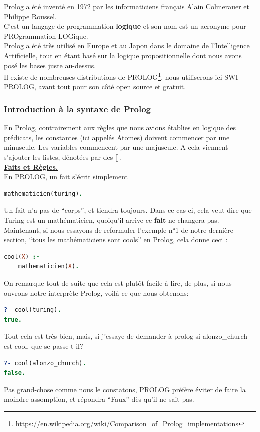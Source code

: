 \documentclass[a4paper, 12pt]{article}
\numberwithin{equation}{subsection}
\begin{document}
Prolog a été inventé en 1972 par les informaticiens français Alain Colmerauer et Philippe Roussel. \\

C'est un langage de programmation {\bf logique} et son nom est un acronyme pour PROgrammation LOGique. \\

Prolog a été très utilisé en Europe et au Japon dans le domaine de l'Intelligence Artificielle, tout en étant basé sur la logique propositionnelle dont nous avons posé les bases juste au-dessus. \\

Il existe de nombreuses distributions de PROLOG\footnote{https://en.wikipedia.org/wiki/Comparison\_of\_Prolog\_implementations}, nous utiliserons ici SWI-PROLOG, avant tout pour son côté open source et gratuit.
\subsubsection{Introduction à la syntaxe de Prolog}
En Prolog, contrairement aux règles que nous avions établies en logique des prédicats, les constantes (ici appelés Atomes) doivent commencer par une minuscule. Les variables commencent par une majuscule. A cela viennent s'ajouter les listes, dénotées par des []. \\

\underline{{\bf Faits et Règles.}} \\[0.2cm]
En PROLOG, un fait s'écrit simplement \\
\begin{lstlisting}[language=Prolog]
mathematicien(turing).
\end{lstlisting}
Un fait n'a pas de ``corps'', et tiendra toujours. Dans ce cas-ci, cela veut dire que Turing est un mathématicien, quoiqu'il arrive ce {\bf fait} ne changera pas. \\

Maintenant, si nous essayons de reformuler l'exemple n°1 de notre dernière section, ``tous les mathématiciens sont cools'' en Prolog, cela donne ceci :
\begin{lstlisting}[language=Prolog]
cool(X) :-
    mathematicien(X).
\end{lstlisting}
On remarque tout de suite que cela est plutôt facile à lire, de plus, si nous ouvrons notre interprète Prolog, voilà ce que nous obtenons:
\begin{lstlisting}[language=Prolog]
?- cool(turing).
true.
\end{lstlisting}
Tout cela est très bien, mais, si j'essaye de demander à prolog si alonzo\_church est cool, que se passe-t-il?
\begin{lstlisting}[language=Prolog]
?- cool(alonzo_church).
false.
\end{lstlisting}
Pas grand-chose comme nous le constatons, PROLOG préfère éviter de faire la moindre assomption, et répondra ``Faux'' dès qu'il ne sait pas.\\
\end{document}

